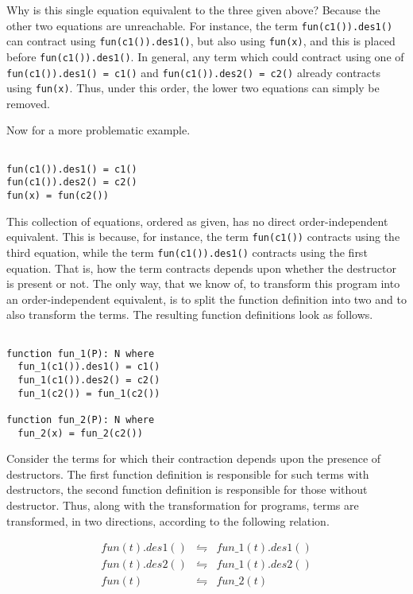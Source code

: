 Why is this single equation equivalent to the three given above? Because the other two equations are unreachable. For instance, the term \texttt{fun(c1()).des1()} can contract using \texttt{fun(c1()).des1()}, but also using \texttt{fun(x)}, and this is placed before \texttt{fun(c1()).des1()}. In general, any term which could contract using one of \texttt{fun(c1()).des1() = c1()}  and \texttt{fun(c1()).des2() = c2()} already contracts using \texttt{fun(x)}. Thus, under this order, the lower two equations can simply be removed.

Now for a more problematic example. 

\begin{lstlisting}

fun(c1()).des1() = c1()
fun(c1()).des2() = c2()
fun(x) = fun(c2())

\end{lstlisting}

This collection of equations, ordered as given, has no direct order-independent equivalent. This is because, for instance, the term \texttt{fun(c1())} contracts using the third equation, while the term \texttt{fun(c1()).des1()} contracts using the first equation. That is, how the term contracts depends upon whether the destructor is present or not. The only way, that we know of, to transform this program into an order-independent equivalent, is to split the function definition into two and to also transform the terms. The resulting function definitions look as follows.

\begin{lstlisting}

function fun_1(P): N where
  fun_1(c1()).des1() = c1()
  fun_1(c1()).des2() = c2()
  fun_1(c2()) = fun_1(c2())

function fun_2(P): N where
  fun_2(x) = fun_2(c2())

\end{lstlisting}

Consider the terms for which their contraction depends upon the presence of destructors. The first function definition is responsible for such terms with destructors, the second function definition is responsible for those without destructor. Thus, along with the transformation for programs, terms are transformed, in two directions, according to the following relation.

\begin{align*}
& fun(t).des1() &\leftrightharpoons &fun\_1(t).des1() &\\
& fun(t).des2() &\leftrightharpoons &fun\_1(t).des2() &\\
& fun(t) &\leftrightharpoons &fun\_2(t) &
\end{align*}